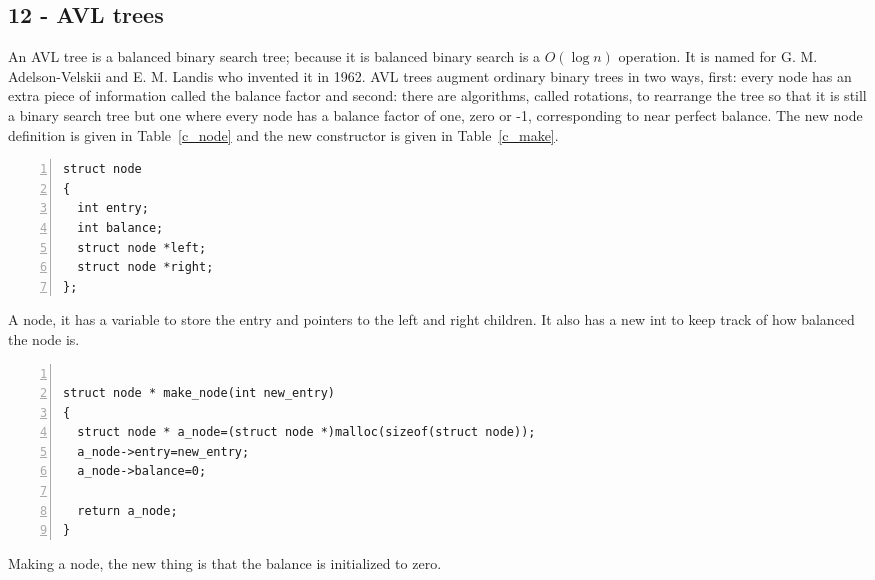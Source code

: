 \documentclass[11pt,a4paper]{scrartcl}
\begin{document}

\subsection*{12 - AVL trees}

An AVL tree is a balanced binary search tree; because it is balanced
binary search is a $O(\log{n})$ operation. It is named for
G. M. Adelson-Velskii and E. M. Landis who invented it in 1962. AVL
trees augment ordinary binary trees in two ways, first: every node has
an extra piece of information called the balance factor and second:
there are algorithms, called rotations, to rearrange the tree so that
it is still a binary search tree but one where every node has a
balance factor of one, zero or -1, corresponding to near perfect
balance. The new node definition is given in Table~\ref{c_node} and
the new constructor is given in Table~\ref{c_make}.

\begin{table}[b]
\begin{lstlisting}[numbers=left]
struct node
{
  int entry;
  int balance;
  struct node *left;
  struct node *right;
};
\end{lstlisting}
\caption{A node, it has a variable to store the entry and pointers to
  the left and right children. It also has a new int to keep track of
  how balanced the node is.\label{c_node}}
\end{table}


\begin{table}
\begin{lstlisting}[numbers=left]

struct node * make_node(int new_entry)
{
  struct node * a_node=(struct node *)malloc(sizeof(struct node));
  a_node->entry=new_entry;
  a_node->balance=0;

  return a_node;
}
\end{lstlisting}
\caption{Making a node, the new thing is that the balance is initialized to zero.\label{c_make}}
\end{table}
\end{document}
